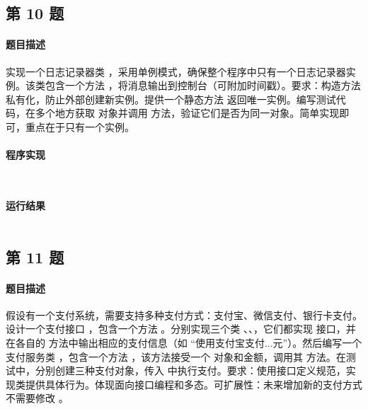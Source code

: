 \documentclass{academics}
\begin{document}
\subsection{第 10 题}

\paragraph{题目描述} {
    实现一个日志记录器类 ，采用单例模式，确保整个程序中只有一个日志记录器实例。该类包含一个方法 ，将消息输出到控制台（可附加时间戳）。要求：构造方法私有化，防止外部创建新实例。提供一个静态方法  返回唯一实例。编写测试代码，在多个地方获取  对象并调用  方法，验证它们是否为同一对象。简单实现即可，重点在于只有一个实例。
}

\paragraph{程序实现} {
    \inputminted[label=Logger.java]{java}{../src/P10/Logger.java}
    \inputminted[label=Main.java]{java}{../src/P10/Main.java}
}

\paragraph{运行结果} {
    \inputminted{text}{../res/P10.out}
}

\subsection{第 11 题}

\paragraph{题目描述} {
    假设有一个支付系统，需要支持多种支付方式：支付宝、微信支付、银行卡支付。设计一个支付接口 ，包含一个方法 。分别实现三个类 、、，它们都实现  接口，并在各自的  方法中输出相应的支付信息（如 ``使用支付宝支付...元''）。然后编写一个支付服务类 ，包含一个方法 ，该方法接受一个  对象和金额，调用其  方法。在测试中，分别创建三种支付对象，传入  中执行支付。要求：使用接口定义规范，实现类提供具体行为。体现面向接口编程和多态。可扩展性：未来增加新的支付方式不需要修改 。
}
\end{document}
